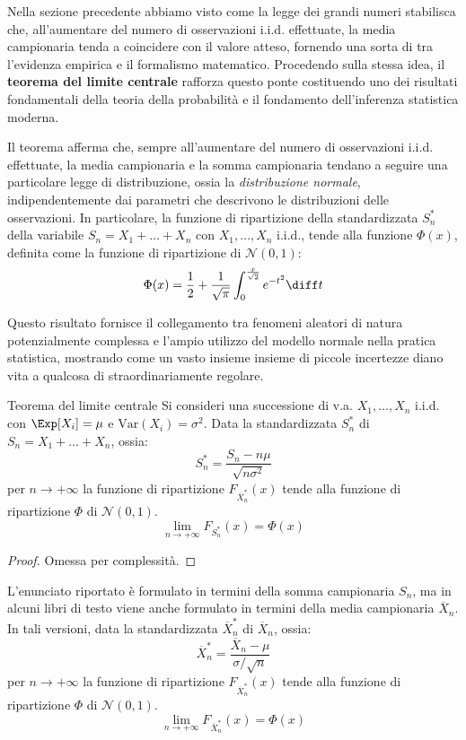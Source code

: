 \documentclass[a4paper, 12pt]{report}
\begin{document}
    Nella sezione precedente abbiamo visto come la legge dei grandi numeri stabilisca che, all'aumentare del numero di osservazioni i.i.d. effettuate, la media campionaria tenda a coincidere con il valore atteso, fornendo una sorta di  tra l'evidenza empirica e il formalismo matematico. Procedendo sulla stessa idea, il \textbf{teorema del limite centrale} rafforza questo ponte costituendo uno dei risultati fondamentali della teoria della probabilità e il fondamento dell'inferenza statistica moderna.
    
    Il teorema afferma che, sempre all'aumentare del numero di osservazioni i.i.d. effettuate, la media campionaria e la somma campionaria tendano a seguire una particolare legge di distribuzione, ossia la \textit{distribuzione normale}, indipendentemente dai parametri che descrivono le distribuzioni delle osservazioni. In particolare, la funzione di ripartizione della standardizzata $S_n^*$ della variabile $S_n = X_1 + \ldots + X_n$ con $X_1, \ldots, X_n$ i.i.d., tende alla funzione $\Phi(x)$, definita come la funzione di ripartizione di $\mathcal{N}(0,1)$:
    \[\Phi(x) = \frac{1}{2} + \frac{1}{\sqrt{\pi}} \int_{0}^{\frac{x}{\sqrt{2}}} e^{-t^2} \diff t \] 
    
    Questo risultato fornisce il collegamento tra fenomeni aleatori di natura potenzialmente complessa e l'ampio utilizzo del modello normale nella pratica statistica, mostrando come un vasto insieme insieme di piccole incertezze diano vita a qualcosa di straordinariamente regolare.

    \begin{framedthm}{Teorema del limite centrale}
        Si consideri una successione di v.a. $X_1, \ldots, X_n$ i.i.d. con $\Exp[X_i] = \mu$ e $\mathrm{Var}(X_i) = \sigma^2$. Data la standardizzata $S^*_n$ di $S_n = X_1 + \ldots + X_n$, ossia:
        \[S^*_n = \frac{S_n - n\mu}{\sqrt{n \sigma^2}}\]
        per $n \to +\infty$ la funzione di ripartizione $F_{\overline{X}^*_n}(x)$ tende alla funzione di ripartizione $\Phi$ di $\mathcal{N}(0,1)$. 
        \[\lim_{n \to +\infty} F_{S^*_n}(x) = \Phi(x)\]
    \end{framedthm}

    \begin{proof}
        Omessa per complessità.
    \end{proof}

    L'enunciato riportato è formulato in termini della somma campionaria $S_n$, ma in alcuni libri di testo viene anche formulato in termini della media campionaria $\overline{X}_n$. In tali versioni, data la standardizzata $\overline{X}^*_n$ di $\overline{X}_n$, ossia:
    \[\overline{X}^*_n = \frac{\overline{X}_n - \mu}{\sigma / \sqrt{n}}\]
    per $n \to +\infty$ la funzione di ripartizione $F_{\overline{X}^*_n}(x)$ tende alla funzione di ripartizione $\Phi$ di $\mathcal{N}(0,1)$. 
    \[\lim_{n \to +\infty} F_{\overline{X}^*_n}(x) = \Phi(x)\]
\end{document}

